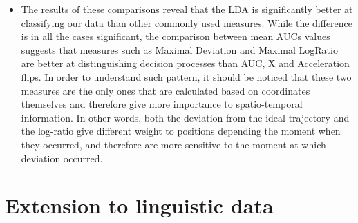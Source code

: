 \documentclass{article}
\newcommand{\addMM}[1]{{\leavevmode\color{red}#1}}
\begin{document}
\begin{itemize}
\item The results of these comparisons reveal that the LDA is significantly better at classifying our data than other commonly used measures. While the difference is in all the cases significant, the comparison between mean AUCs values suggests that measures such as Maximal Deviation and Maximal LogRatio are better at distinguishing decision processes than AUC, X and Acceleration flips. \addMM{In order to understand such pattern, it should be noticed that these two measures are the only ones that are calculated based on coordinates themselves and therefore give more importance to spatio-temporal information. In other words, both the deviation from the ideal trajectory and  the log-ratio give different weight to positions depending the moment when they occurred, and therefore are more sensitive to the moment at which deviation occurred.} 





\end{itemize}







\section{Extension to linguistic data}
\end{document}
